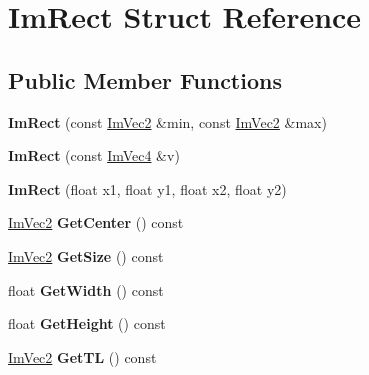 \hypertarget{struct_im_rect}{}\section{Im\+Rect Struct Reference}
\label{struct_im_rect}
\subsection*{Public Member Functions}
\begin{DoxyCompactItemize}
\item 
\mbox{\label{struct_im_rect_a2f0ff273434bfd9d22bb699fd7a63a1f}} 
{\bfseries Im\+Rect} (const \hyperlink{struct_im_vec2}{Im\+Vec2} \&min, const \hyperlink{struct_im_vec2}{Im\+Vec2} \&max)
\item 
\mbox{\label{struct_im_rect_adfe8d43381f9af8a3e3ea32a3821ab84}} 
{\bfseries Im\+Rect} (const \hyperlink{struct_im_vec4}{Im\+Vec4} \&v)
\item 
\mbox{\label{struct_im_rect_a4cd168f1ae088e15db64b95b880f8933}} 
{\bfseries Im\+Rect} (float x1, float y1, float x2, float y2)
\item 
\mbox{\label{struct_im_rect_aae13f8003184fd84f29d27c3c074cf43}} 
\hyperlink{struct_im_vec2}{Im\+Vec2} {\bfseries Get\+Center} () const
\item 
\mbox{\label{struct_im_rect_ae459d9c50003058cfb34519a571aaf33}} 
\hyperlink{struct_im_vec2}{Im\+Vec2} {\bfseries Get\+Size} () const
\item 
\mbox{\label{struct_im_rect_afa75cb8491f20901c96166d17dcddac4}} 
float {\bfseries Get\+Width} () const
\item 
\mbox{\label{struct_im_rect_a748d8ae9cb26508951ec6e2f2df0625b}} 
float {\bfseries Get\+Height} () const
\item 
\mbox{\label{struct_im_rect_a1d4d972329722b51dca4499cb5931b4b}} 
\hyperlink{struct_im_vec2}{Im\+Vec2} {\bfseries Get\+TL} () const
\item 
\mbox{\label{struct_im_rect_acae90248a96be4acf1524071fca1c3f3}} 

\end{DoxyCompactItemize}
